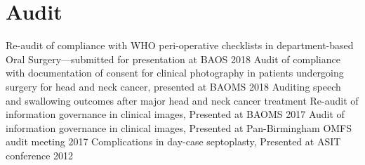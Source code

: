 \section*{Audit}

Re-audit of compliance with WHO peri-operative checklists in department-based Oral Surgery---submitted for presentation at BAOS 2018
Audit of compliance with documentation of consent for clinical photography in patients undergoing surgery for head and neck cancer, presented at BAOMS 2018
Auditing speech and swallowing outcomes after major head and neck cancer treatment
Re-audit of information governance in clinical images, Presented at BAOMS 2017
Audit of information governance in clinical images, Presented at Pan-Birmingham OMFS audit meeting 2017
Complications in day-case septoplasty, Presented at ASIT conference 2012

